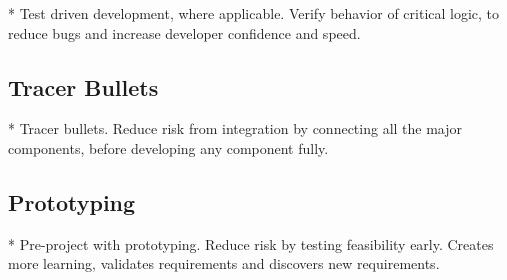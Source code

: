 * Test driven development, where applicable. Verify behavior of critical logic, to reduce bugs and increase developer confidence and speed.

\subsection{Tracer Bullets}
* Tracer bullets. Reduce risk from integration by connecting all the major components, before developing any component fully.

\subsection{Prototyping}

* Pre-project with prototyping. Reduce risk by testing feasibility early. Creates more learning, validates requirements and discovers new requirements.
